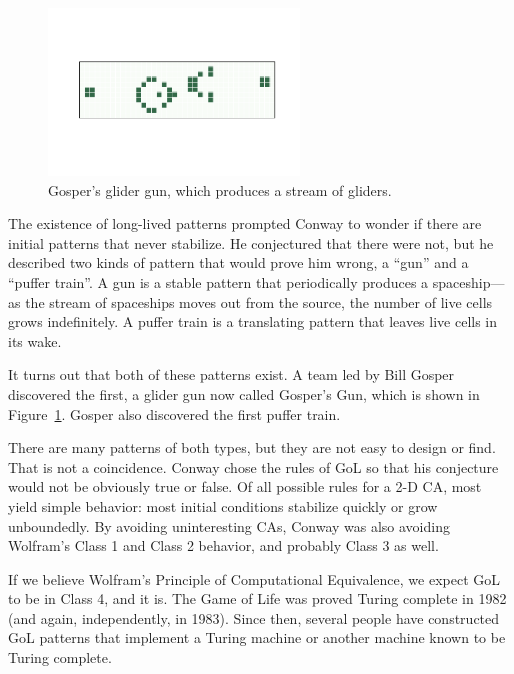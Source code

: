 \documentclass[12pt]{book}
\theoremstyle{exercise}
\begin{document}


\begin{figure}
\centerline{\includegraphics[height=1.75in]{figs/chap06-5.pdf}}
\caption{Gosper's glider gun, which produces a stream of gliders.}
\label{chap06-5}
\end{figure}

The existence of long-lived patterns prompted Conway to wonder if
there are initial patterns that never stabilize.  He
conjectured that there were not, but he described two kinds of pattern
that would prove him wrong, a ``gun'' and a ``puffer train''.  A gun
is a stable pattern that periodically produces a spaceship---as the
stream of spaceships moves out from the source, the number of live
cells grows indefinitely.  A puffer train is a translating pattern
that leaves live cells in its wake.


It turns out that both of these patterns exist.  A team led
by Bill Gosper discovered the first, a glider gun now called
Gosper's Gun, which is shown in Figure~\ref{chap06-5}.
Gosper also discovered the first puffer train.


There are many patterns of both types, but they are not easy to
design or find.  That is not a coincidence.  Conway chose the
rules of GoL so that his conjecture would not be obviously
true or false.  Of all possible rules for a 2-D CA, most
yield simple behavior: most initial conditions stabilize quickly
or grow unboundedly.  By avoiding uninteresting CAs, Conway
was also avoiding Wolfram's Class 1 and Class 2 behavior, and
probably Class 3 as well.

If we believe Wolfram's Principle of Computational Equivalence, we
expect GoL to be in Class 4, and it is.  The Game of Life was proved
Turing complete in 1982 (and again, independently, in 1983).
Since then, several people have constructed GoL patterns that implement
a Turing machine or another machine known to be Turing complete.
\end{document}
